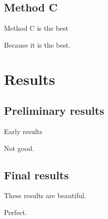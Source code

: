 \documentclass[aspectratio=43]{beamer}
\begin{document}
\subsection*{Method C}

\begin{frame}{Method C is the best}

    Because it is the best.

\end{frame}

\section{Results}

\subsection*{Preliminary results}

\begin{frame}{Early results}

    Not good.

\end{frame}

\subsection*{Final results}

\begin{frame}{These results are beautiful.}

    Perfect.

\end{frame}
\end{document}
